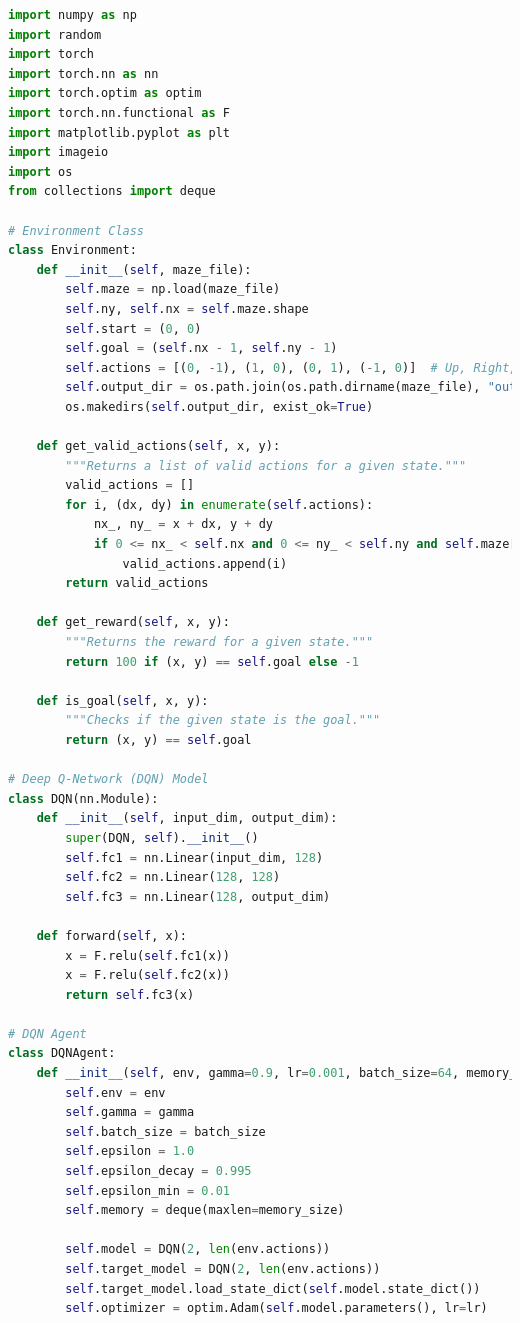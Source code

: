 \documentclass[11pt]{article}
\begin{document}
\begin{lstlisting}[language=Python]
import numpy as np
import random
import torch
import torch.nn as nn
import torch.optim as optim
import torch.nn.functional as F
import matplotlib.pyplot as plt
import imageio
import os
from collections import deque

# Environment Class
class Environment:
    def __init__(self, maze_file):
        self.maze = np.load(maze_file)
        self.ny, self.nx = self.maze.shape
        self.start = (0, 0)
        self.goal = (self.nx - 1, self.ny - 1)
        self.actions = [(0, -1), (1, 0), (0, 1), (-1, 0)]  # Up, Right, Down, Left
        self.output_dir = os.path.join(os.path.dirname(maze_file), "output_dqn")
        os.makedirs(self.output_dir, exist_ok=True)

    def get_valid_actions(self, x, y):
        """Returns a list of valid actions for a given state."""
        valid_actions = []
        for i, (dx, dy) in enumerate(self.actions):
            nx_, ny_ = x + dx, y + dy
            if 0 <= nx_ < self.nx and 0 <= ny_ < self.ny and self.maze[ny_, nx_] == 0:
                valid_actions.append(i)
        return valid_actions

    def get_reward(self, x, y):
        """Returns the reward for a given state."""
        return 100 if (x, y) == self.goal else -1

    def is_goal(self, x, y):
        """Checks if the given state is the goal."""
        return (x, y) == self.goal

# Deep Q-Network (DQN) Model
class DQN(nn.Module):
    def __init__(self, input_dim, output_dim):
        super(DQN, self).__init__()
        self.fc1 = nn.Linear(input_dim, 128)
        self.fc2 = nn.Linear(128, 128)
        self.fc3 = nn.Linear(128, output_dim)

    def forward(self, x):
        x = F.relu(self.fc1(x))
        x = F.relu(self.fc2(x))
        return self.fc3(x)

# DQN Agent
class DQNAgent:
    def __init__(self, env, gamma=0.9, lr=0.001, batch_size=64, memory_size=50000):
        self.env = env
        self.gamma = gamma
        self.batch_size = batch_size
        self.epsilon = 1.0
        self.epsilon_decay = 0.995
        self.epsilon_min = 0.01
        self.memory = deque(maxlen=memory_size)

        self.model = DQN(2, len(env.actions))
        self.target_model = DQN(2, len(env.actions))
        self.target_model.load_state_dict(self.model.state_dict())
        self.optimizer = optim.Adam(self.model.parameters(), lr=lr)


\end{lstlisting}
\end{document}
